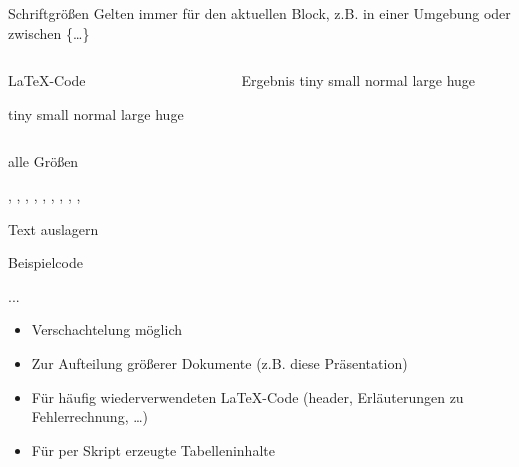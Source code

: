 \begin{frame}[fragile]{Schriftgrößen}
  Gelten immer für den aktuellen Block, z.B. in einer Umgebung oder zwischen \{\dots\}
  \begin{columns}[t]
    \begin{column}{0.47\textwidth}
      \begin{block}{\LaTeX-Code}
        \begin{lstverbatim}
        {\tiny tiny}
        {\small small}
        {\normalsize normal}
        {\large large}
        {\huge huge}
        \end{lstverbatim}
      \end{block}
    \end{column}
    \begin{column}{0.47\textwidth}
      \begin{block}{Ergebnis}
        {\tiny tiny}
        {\small small}
        {\normalsize normal}
        {\large large}
        {\huge huge}
      \end{block}
    \end{column}
  \end{columns}
  \vspace{1em}
  \begin{block}{alle Größen}
    \begin{lstverbatim}
    \tiny, \scriptsize, \footnotesize, \small, \normalsize, \large, \Large, \LARGE, \huge, \Huge
    \end{lstverbatim}
  \end{block}
\end{frame}

\begin{frame}[fragile]{Text auslagern}
  \begin{block}{Beispielcode}
    \begin{lstverbatim}
    
    
    
    
    ...
    
    \end{lstverbatim}
  \end{block}
  \begin{itemize}
    \item Verschachtelung möglich
    \item Zur Aufteilung größerer Dokumente (z.B. diese Präsentation)
    \item Für häufig wiederverwendeten \LaTeX-Code (header, Erläuterungen zu Fehlerrechnung, \ldots)
    \item Für per Skript erzeugte Tabelleninhalte
  \end{itemize}
\end{frame}

